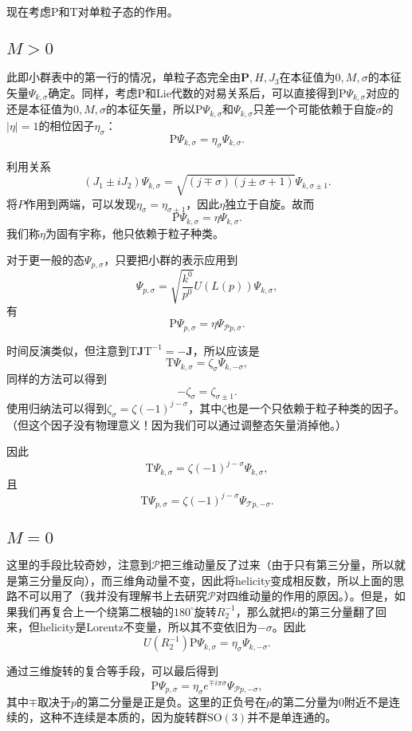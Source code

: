 \documentclass[9pt]{extbook}
\begin{document}
现在考虑$\mathrm{P}$和$\mathrm{T}$对单粒子态的作用。

\subsection*{$M>0$}
此即小群表中的第一行的情况，单粒子态完全由$\bm{P},H,J_3$在本征值为$0,M,\sigma$的本征矢量$\Psi_{k,\sigma}$确定。同样，考虑$\mathrm{P}$和Lie代数的对易关系后，可以直接得到$\mathrm{P}\Psi_{k,\sigma}$对应的还是本征值为$0,M,\sigma$的本征矢量，所以$\mathrm{P}\Psi_{k,\sigma}$和$\Psi_{k,\sigma}$只差一个可能依赖于自旋$\sigma$的$|\eta|=1$的相位因子$\eta_{\sigma}$：
\[
\mathrm{P}\Psi_{k,\sigma}=\eta_{\sigma}\Psi_{k,\sigma}.
\]

利用关系
\[
(J_1\pm iJ_2)\Psi_{k,\sigma}=\sqrt{(j\mp \sigma)(j\pm \sigma+1)}\Psi_{k,\sigma\pm 1}.
\]
将$P$作用到两端，可以发现$\eta_{\sigma}=\eta_{\sigma\pm 1}$，因此$\eta$独立于自旋。故而
\[
\mathrm{P}\Psi_{k,\sigma}=\eta\Psi_{k,\sigma}.
\]
我们称$\eta$为固有宇称，他只依赖于粒子种类。

对于更一般的态$\Psi_{p,\sigma}$，只要把小群的表示应用到
\[
\Psi_{p,\sigma}=\sqrt{\frac{k^0}{p^0}}U(L(p))\Psi_{k,\sigma},
\]
有
\[
\mathrm{P}\Psi_{p,\sigma}=\eta\Psi_{\mathscr{P}p,\sigma}.
\]

时间反演类似，但注意到$\mathrm{T}\bm{J}\mathrm{T}^{-1}=-\bm{J}$，所以应该是
\[
\mathrm{T}\Psi_{k,\sigma}=\zeta_{\sigma}\Psi_{k,-\sigma},
\]
同样的方法可以得到
\[
-\zeta_{\sigma}=\zeta_{\sigma\pm 1}.
\]
使用归纳法可以得到$\zeta_{\sigma}=\zeta(-1)^{j-\sigma}$，其中$\zeta$也是一个只依赖于粒子种类的因子。（但这个因子没有物理意义！因为我们可以通过调整态矢量消掉他。）

因此
\[
\mathrm{T}\Psi_{k,\sigma}=\zeta(-1)^{j-\sigma}\Psi_{k,\sigma},
\]
且
\[
\mathrm{T}\Psi_{p,\sigma}=\zeta(-1)^{j-\sigma}\Psi_{\mathscr{T}p,-\sigma}.
\]

\subsection*{$M=0$}
这里的手段比较奇妙，注意到$\mathscr{P}$把三维动量反了过来（由于只有第三分量，所以就是第三分量反向），而三维角动量不变，因此将helicity变成相反数，所以上面的思路不可以用了（我并没有理解书上去研究$\mathscr{P}$对四维动量的作用的原因。）。但是，如果我们再复合上一个绕第二根轴的$180^\circ$旋转$R_2^{-1}$，那么就把$k$的第三分量翻了回来，但helicity是Lorentz不变量，所以其不变依旧为$-\sigma$。因此
\[
U(R_2^{-1})\mathrm{P}\Psi_{k,\sigma}=\eta_{\sigma}\Psi_{k,-\sigma}.
\]

通过三维旋转的复合等手段，可以最后得到
\[
\mathrm{P}\Psi_{p,\sigma}=\eta_{\sigma}e^{\mp i\pi\sigma}\Psi_{\mathscr{P}p,-\sigma},
\]
其中$\mp$取决于$p$的第二分量是正是负。这里的正负号在$p$的第二分量为0附近不是连续的，这种不连续是本质的，因为旋转群$\mathrm{SO}(3)$并不是单连通的。
\end{document}
